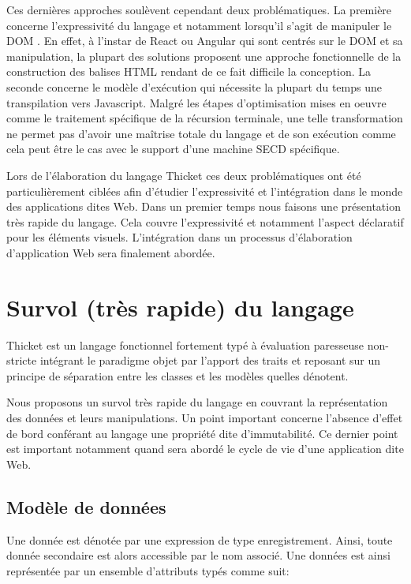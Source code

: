 \documentclass[twoside,a4paper]{article}
\begin{document}
Ces dernières  approches soulèvent cependant deux  problématiques.  La
première  concerne l'expressivité  du langage  et notamment  lorsqu'il
s'agit de manipuler le DOM \cite{dom}.   En effet, à l'instar de React
\cite{react} ou Angular  \cite{angularjs} qui sont centrés  sur le DOM
et sa  manipulation, la plupart  des solutions proposent  une approche
fonctionnelle de la  construction des balises HTML rendant  de ce fait
difficile la  conception.  La  seconde concerne le  modèle d'exécution
qui nécessite la  plupart du temps une  transpilation vers Javascript.
Malgré les étapes  d’optimisation mises en oeuvre  comme le traitement
spécifique  de la  récursion  terminale, une  telle transformation  ne
permet pas d’avoir une maîtrise totale  du langage et de son exécution
comme  cela peut  être  le  cas avec  le  support  d’une machine  SECD
spécifique.

Lors  de  l'élaboration du  langage  Thicket  \cite{thicket} ces  deux
problématiques  ont   été  particulièrement  ciblées   afin  d'étudier
l'expressivité et  l'intégration dans le monde  des applications dites
Web.  Dans un premier temps  nous faisons une présentation très rapide
du  langage.    Cela  couvre  l'expressivité  et   notamment  l'aspect
déclaratif pour les éléments visuels.  L'intégration dans un processus
d'élaboration d'application Web sera finalement abordée.

\section{Survol (très rapide) du langage}

Thicket  est  un  langage  fonctionnel  fortement  typé  à  évaluation
paresseuse non-stricte  intégrant le paradigme objet  par l'apport des
traits \cite{trait}  et reposant sur  un principe de  séparation entre
les classes et les modèles quelles dénotent.

Nous  proposons  un survol  très  rapide  du  langage en  couvrant  la
représentation des données et  leurs manipulations. Un point important
concerne l'absence d'effet de bord  conférant au langage une propriété
dite d'immutabilité.   Ce dernier point est  important notamment quand
sera abordé le cycle de vie d'une application dite Web.

\subsection{Modèle de données}

Une  donnée est  dénotée par  une expression  de type  enregistrement.
Ainsi,  toute  donnée  secondaire  est alors  accessible  par  le  nom
associé.   Une   données  est   ainsi  représentée  par   un  ensemble
d'attributs typés comme suit:
\end{document}

